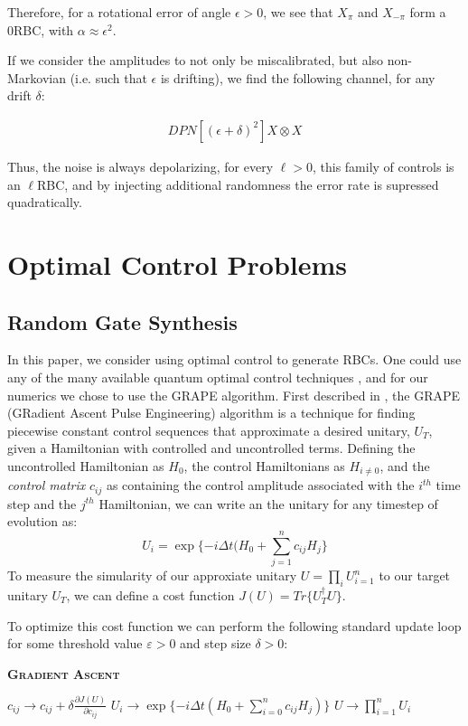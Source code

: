 \documentclass[aps,nofootinbib,pra,notitlepage,twocolumn]{revtex4-1}
\begin{document}
Therefore, for a rotational error of angle $\epsilon > 0$, we see that $X_\pi$ and  $X_{-\pi}$  form a 0RBC, with $\alpha\approx\epsilon^2$.

If we consider the amplitudes to not only be miscalibrated, but also non-Markovian (i.e. such that $\epsilon$ is drifting), we find the following channel, for any drift $\delta$:

\begin{equation}
  \begin{gathered}
  DPN[(\epsilon + \delta)^2]X\otimes X
  \end{gathered}
\end{equation}

Thus, the noise is always depolarizing, for every $\ell > 0$, this family of controls is an $\ell$RBC, and by injecting additional randomness the error rate is supressed quadratically.

\section{Optimal Control Problems}\label{ocp}
\subsection{Random Gate Synthesis}
 In this paper, we consider using optimal control to generate RBCs. One could use any of the many available quantum optimal control techniques \cite{Khaneja2005, Caneva2011, Machnes2018}, and for our numerics we chose to use the GRAPE algorithm. First described in \cite{Khaneja2005}, the GRAPE (GRadient Ascent Pulse Engineering) algorithm is a technique for finding piecewise constant control sequences that approximate a desired unitary, $U_T$, given a Hamiltonian with controlled and uncontrolled terms. Defining the uncontrolled Hamiltonian as $H_0$, the control Hamiltonians as $H_{i\neq 0}$, and the \textit{control matrix} $c_{ij}$ as containing the control amplitude associated with the $i^{th}$ time step and the $j^{th}$ Hamiltonian, we can write an the unitary for any timestep of evolution as:
\begin{equation}\label{eq:3}
  U_i = \exp\{-i\Delta t(H_0 + \sum_{j=1}^{n}c_{ij}H_{j}\}
\end{equation}
To measure the simularity of our approxiate unitary $U=\prod_iU_{i=1}^n$ to our target unitary $U_T$, we can define a cost function $J(U) = Tr\{U_T^{\dagger}U\}$.

To optimize this cost function we can perform the following standard update loop for some threshold value $\varepsilon > 0$ and step size $\delta > 0$:
\begin{algorithm}[H]
  \caption{\textsc{\textbf{Gradient Ascent}}}
  \begin{algorithmic}
    \State $c_{ij} \rightarrow c_{ij} + \delta\frac{\partial J(U)}{\partial c_{ij}}$
    \State $U_i \rightarrow \exp\{-i\Delta t(H_0 + \sum_{i=0}^{n}c_{ij}H_j)\}$
    \EndFor
    \State $U \rightarrow \prod_{i=1}^nU_i$
    \EndWhile
  \end{algorithmic}
\end{algorithm}
\end{document}
